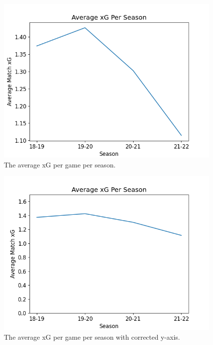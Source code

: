 \documentclass[12pt, a4paper, twocolumn]{article}
\begin{document}
\begin{figure}
  \includegraphics[width=\linewidth]{../vis/tables/average_xg_pergame.png}
  \caption{The average xG per game per season.}
  \label{xg_pergame}
\end{figure}

\begin{figure}
  \includegraphics[width=\linewidth]{../vis/tables/average_xg_pergame_newaxis.png}
  \caption{The average xG per game per season with corrected y-axis.}
  \label{xg_axis}
\end{figure}
\end{document}
